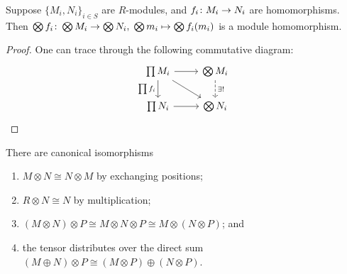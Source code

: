 \begin{lemma}
    Suppose \({\{M_i, N_i\}}_{i \in S}\) are \(R\)-modules,
    and \(f_i\colon M_i\to N_i\) are homomorphisms.
    Then \(\bigotimes f_i\colon\bigotimes M_i\to\bigotimes N_i,\;\bigotimes m_i\mapsto\bigotimes f_i(m_i)\)
    is a module homomorphism.
\end{lemma}
\begin{proof}
    One can trace through the following commutative diagram:
    \begin{equation*}
        \begin{tikzcd}
            \prod M_i \arrow{r} \arrow{d}[swap]{\prod f_i} \arrow{dr} &
            \bigotimes M_i \arrow[dashrightarrow]{d}{\exists!} \\
            \prod N_i \arrow{r} & \bigotimes N_i
        \end{tikzcd}
    \end{equation*}
\end{proof}
\begin{theorem}\label{thm:tensor-isomorphisms}
    There are canonical isomorphisms
    \begin{enumerate}[label={(\alph*)}, itemsep=0mm]
        \item \(M \otimes N \cong N \otimes M\) by exchanging positions;
        \item \(R \otimes N \cong N\) by multiplication;
        \item \((M \otimes N) \otimes P \cong M \otimes N \otimes P \cong M \otimes (N \otimes P)\); and
        \item the tensor distributes over the direct sum
            \((M \oplus N) \otimes P \cong (M \otimes P) \oplus (N \otimes P)\).
    \end{enumerate}
\end{theorem}
